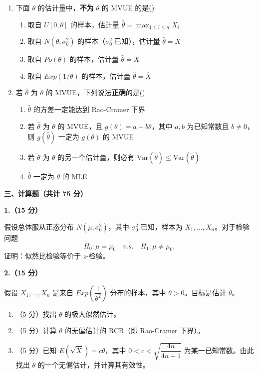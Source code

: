 \documentclass[12pt,a4paper]{ctexart}
\newcommand{\question}[2]{\bigskip\noindent\textbf{#1}\par\nobreak\medskip}
\newcommand{\Var}{\mathrm{Var}}
\begin{document}
\begin{enumerate}[label=\arabic*.,leftmargin=2.2em]
  \item 下面 $\theta$ 的估计量中，\textbf{不为} $\theta$ 的 MVUE 的是\hfill(\underline{\hspace{1.2cm}})
  \begin{enumerate}[label=\Alph*.,leftmargin=2.0em]
    \item 取自 $U[0,\theta]$ 的样本，估计量 $\widehat{\theta}=\max_{1\le i\le n}X_{i}$
    \item 取自 $N(\theta,\sigma_{0}^{2})$ 的样本（$\sigma_{0}^{2}$ 已知），估计量 $\widehat{\theta}=\overline{X}$
    \item 取自 $Po(\theta)$ 的样本，估计量 $\widehat{\theta}=\overline{X}$
    \item 取自 $Exp(1/\theta)$ 的样本，估计量 $\widehat{\theta}=\overline{X}$
  \end{enumerate}

  \item 若 $\widehat{\theta}$ 为 $\theta$ 的 MVUE，下列说法\textbf{正确}的是\hfill(\underline{\hspace{1.2cm}})
  \begin{enumerate}[label=\Alph*.,leftmargin=2.0em]
    \item $\widehat{\theta}$ 的方差一定能达到 Rao-Cramer 下界
    \item 若 $\widehat{\theta}$ 为 $\theta$ 的 MVUE，且 $g(\theta)=a+b\theta$，其中 $a,b$ 为已知常数且 $b\neq0$，则 $g(\widehat{\theta})$ 一定为 $g(\theta)$ 的 MVUE
    \item 若 $\widetilde{\theta}$ 为 $\theta$ 的另一个估计量，则必有 $\Var\left(\widehat{\theta}\right)\le\Var\left(\widetilde{\theta}\right)$
    \item $\widehat{\theta}$ 一定为 $\theta$ 的 MLE
  \end{enumerate}
\end{enumerate}

\bigskip
\begin{center}\textbf{三、计算题（共计 75 分）}\end{center}

\question{1.（15 分）}{15}
假设总体服从正态分布 $N(\mu,\sigma_{0}^{2})$，其中 $\sigma_{0}^{2}$ 已知，样本为 $X_{1},\ldots,X_{n}$。对于检验问题
\[ H_{0}:\mu=\mu_{0}\quad v.s.\quad H_{1}:\mu\neq\mu_{0}, \]
证明：似然比检验等价于 $z$-检验。

\question{2.（15 分）}{15}
假设 $X_{1},\ldots,X_{n}$ 是来自 $Exp\!\left(\dfrac{1}{\theta^{2}}\right)$ 分布的样本，其中 $\theta>0$。目标是估计 $\theta$。
\begin{enumerate}[label=(\arabic*),leftmargin=2.4em]
  \item （5 分）找出 $\theta$ 的极大似然估计。
  \item （5 分）计算 $\theta$ 的无偏估计的 RCB（即 Rao-Cramer 下界）。
  \item （5 分）已知 $E\!\left(\sqrt{\overline{X}}\right)=c\theta$，其中 $0<c<\sqrt{\dfrac{4n}{4n+1}}$ 为某一已知常数。由此找出 $\theta$ 的一个无偏估计，并计算其有效性。
\end{enumerate}
\end{document}
